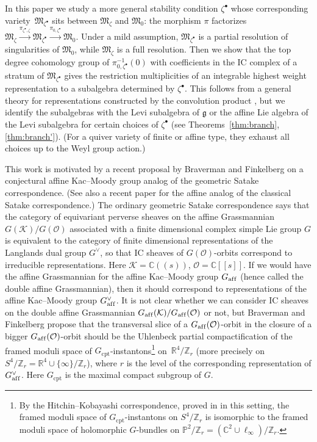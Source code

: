 \documentclass[pdftex]{sigma}
\theoremstyle{definition}
\numberwithin{equation}{section}
\newcommand{\C}{{\mathbb C}}
\newcommand{\Z}{{\mathbb Z}}
\newcommand{\R}{{\mathbb R}}
\newcommand{\proj}{{\mathbb P}}
\newcommand{\CP}{\proj}
\newcommand{\g}{{\mathfrak g}}
\newcommand{\M}{{\mathfrak M}} %
\newcommand{\linf}{\ell_\infty}
\newcommand{\aff}{\mathrm{af\/f}}
\begin{document}
In this paper we study a more general stability condition
$\zeta^\bullet$ whose corresponding variety~$\M_{\zeta^\bullet}$ sits
between $\M_\zeta$ and $\M_0$: the morphism $\pi$ factorizes
\(
   \M_\zeta\xrightarrow{\pi_{\zeta^\bullet, \zeta}}
    \M_{\zeta^\bullet}\xrightarrow{\pi_{0,\zeta^\bullet}}\M_0.
\)
Under a mild assumption, $\M_{\zeta^\bullet}$ is a partial resolution
of singularities of $\M_0$, while $\M_\zeta$ is a full resolution.
%
Then we show that the top degree cohomology group of
$\pi^{-1}_{0,\zeta^\bullet}(0)$ with coef\/f\/icients in the IC complex of
a stratum of $\M_{\zeta^\bullet}$ gives the restriction multiplicities
of an integrable highest weight representation to a subalgebra
determined by $\zeta^\bullet$.
%
This follows from a general theory for representations constructed by
the convolution product \cite{BM}, but we identify the subalgebras
with the Levi subalgebra of $\g$ or the af\/f\/ine Lie algebra of the Levi
subalgebra for certain choices of $\zeta^\bullet$ (see
Theorems~\ref{thm:branch}, \ref{thm:branch'}). (For a quiver variety of
f\/inite or af\/f\/ine type, they exhaust all choices up to the Weyl group
action.)

This work is motivated by a recent proposal by Braverman and
Finkelberg \cite{braverman-2007,braverman-prep} on a conjectural
af\/f\/ine Kac--Moody group analog of the geometric Satake correspondence.
(See also a recent paper \cite{bk} for the af\/f\/ine analog of the
classical Satake correspondence.)
%
The ordinary geometric Satake correspondence says that the category of
equivariant perverse sheaves on the af\/f\/ine Grassmannian $G(\mathcal
K)/G(\mathcal O)$ associated with a f\/inite dimensional complex simple
Lie group $G$ is equivalent to the category of f\/inite dimensional
representations of the Langlands dual group $G^\vee$, so that IC
sheaves of $G(\mathcal O)$-orbits correspond to irreducible
representations.
%
Here $\mathcal K = \C((s))$, $\mathcal O = \C[[s]]$.
%
If we would have the af\/f\/ine Grassmannian for the af\/f\/ine Kac--Moody
group $G_\aff$ (hence called the double af\/f\/ine Grassmannian), then it
should correspond to representations of the af\/f\/ine Kac--Moody group
$G_{\aff}^\vee$.
%
It is not clear whether we can consider IC sheaves on the double
af\/f\/ine Grassmannian $G_{\aff}(\mathcal K)/G_{\aff}(\mathcal O)$ or
not, but Braverman and Finkelberg \cite{braverman-2007,braverman-prep}
propose that the transversal slice of a $G_{\aff}(\mathcal O)$-orbit
in the closure of a bigger $G_{\aff}(\mathcal O)$-orbit should be the
Uhlenbeck partial compactif\/ication of the framed moduli space of
$G_{\mathrm{cpt}}$-instantons\footnote{By the Hitchin--Kobayashi
  correspondence, proved in \cite{Bando} in this setting, the framed
  moduli space of $G_{\mathrm{cpt}}$-instantons on $S^4/\Z_r$ is
  isomorphic to the framed moduli space of holomorphic $G$-bundles on
  $\CP^2/\Z_r = (\C^2\cup\linf)/\Z_r$.} on~$\R^4/\Z_r$ (more precisely
on $S^4/\Z_r = \R^4\cup\{\infty\}/\Z_r$), where $r$ is the level of
the corresponding representation of $G_{\aff}^\vee$.
%
Here $G_{\mathrm{cpt}}$ is the maximal compact subgroup of $G$.
\end{document}

